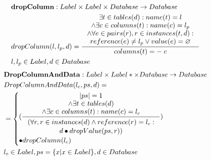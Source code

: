 \documentclass[11pt]{article}
\begin{document}
\begin{align*}
&	\mathbf{dropColumn} : Label \times Label \times Database \rightarrow Database \\
& 	dropColumn(l, l_p, d) = \inference{ \exists t \in tables(d) : name(t) = l \\ \wedge \exists c \in columns(t) : name(c) = l_p \\ \wedge \forall e \in  pairs(r), r \in instances(t, d) : \\ reference(e) \neq l_p \vee value(e) = \varnothing  }{columns(t) =- \; c}\\
&	 l , l_p\in Label, d \in Database 
\end{align*}
\begin{align*}
&	\mathbf{DropColumnAndData} : Label \times Label* \times Database \rightarrow Database \\
&	DropColumnAndData(l_c, ps, d) = \\
&= \begin{cases}
 	(\inference{|ps| = 1 \\ \wedge \exists t \in tables(d) \\ \wedge \exists c \in columns(t) : name(c) = l_c}{\begin{gathered}
	 	(\forall r, r \in instances(d) \wedge reference(r) = l_c: \\d \bullet dropValue(ps, r)) \end{gathered}}) \\ \bullet dropColumn(l_c)  
 \end{cases}
	\\
&	l_c \in Label, ps = \{ x | x \in Label\}, d \in Database
\end{align*}
\end{document}
